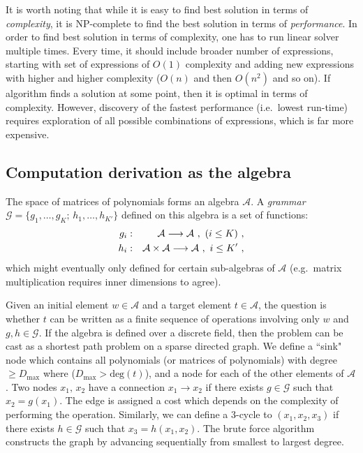It is worth noting that while it is easy to find best solution in
terms of {\em complexity}, it is NP-complete to find the best solution
in terms of {\em performance}. In order to find best solution in terms
of complexity, one has to run linear solver multiple times. Every
time, it should include broader number of expressions, starting with set
of expressions of $O(1)$ complexity and adding new expressions with higher and higher complexity
($O(n)$ and then $O(n^2)$ and so on). If algorithm finds a solution at
some point, then it is optimal in terms of complexity. 
However, discovery of the fastest performance (i.e.~lowest
run-time) requires exploration of all possible combinations of expressions,
which is far more expensive.  

\vspace{-2mm}
\subsection{Computation derivation as the algebra}
The space of matrices of polynomials forms an algebra $\mathcal{A}$.
A \emph{grammar} $\mathcal{G}=\{g_1,\dots,g_{K};\, h_1,\dots,
h_{K'}\}$ defined on this algebra is a set of functions:
\vspace{-1mm}
\begin{eqnarray}
g_i &:& \mathcal{A} \longrightarrow \mathcal{A}~,~(i \leq
K)~,\nonumber \\
h_{i} &:& \mathcal{A} \times \mathcal{A} \longrightarrow \mathcal{A}~,
~i \leq K'~,\nonumber 
 \vspace{-2mm} 
\end{eqnarray}
which might eventually only defined for certain sub-algebras of $\mathcal{A}$ 
(e.g.~matrix multiplication requires inner dimensions to agree). 

Given an initial element $w \in \mathcal{A}$ and a target element $t \in \mathcal{A}$, 
the question is whether $t$ can be written as a finite sequence of operations involving 
only $w$ and $g,h \in \mathcal{G}$.
If the algebra is defined over a discrete field, then the problem can be  
cast as a shortest path problem on a sparse directed graph. 
We define a ``sink" node which contains all polynomials (or matrices of polynomials) with degree $\geq D_{\max}$ 
where ($D_{\max} > \mbox{deg}(t)$), and a node for each of the other elements of $\mathcal{A}$. 
Two nodes $x_1,\,x_2$ have a connection $x_1 \rightarrow x_2$ if there exists $g \in \mathcal{G}$ such that
$x_2 = g(x_1)$. The edge is assigned a cost which depends on the complexity of performing the operation.   
Similarly, we can define a 3-cycle to $(x_1,x_2,x_3)$ if there exists
$h \in \mathcal{G}$ such that $x_3 = h(x_1,x_2)$. The brute force algorithm constructs the graph by advancing sequentially from smallest to largest degree. 


